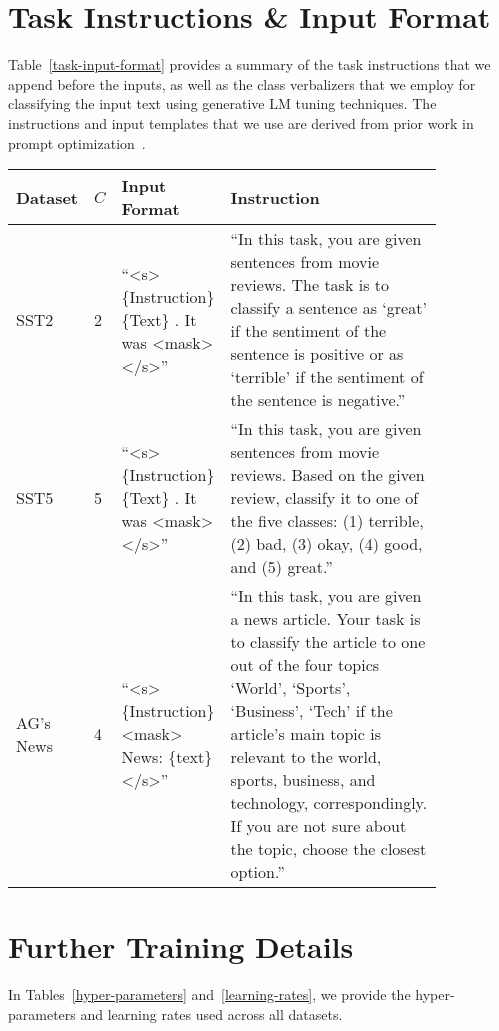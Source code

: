 \documentclass[11pt]{article}
\begin{document}



\appendix

\section{Task Instructions \& Input Format}
\label{task-instruct-input-format:appendix}
Table~\ref{task-input-format} provides a summary of the task instructions that we append before the inputs, as well as the class verbalizers that we employ for classifying the input text using generative LM tuning techniques. The instructions and input templates that we use are derived from prior work in prompt optimization~\cite{deng-etal-2022-rlprompt}.

\begin{table*}
\centering
\caption{Number of Classes $C$, the input format, and the instruction used per dataset. The label words are provided within the instructions.}
\begin{tabular}{ p{0.1\linewidth} | p{0.05\linewidth} | p{0.2\linewidth} | p{0.5\linewidth} }
\hline
Dataset & $C$ & Input Format & Instruction \\
\hline
SST2 & 2 & ``<s> \{Instruction\} \{Text\} . It was <mask> </s>'' & ``In this task, you are given sentences from movie reviews. The task is to classify a sentence as `great' if
the sentiment of the sentence is positive or as `terrible' if the sentiment of the sentence is negative.''\\
\hline
SST5 & 5 & ``<s> \{Instruction\} \{Text\} . It was <mask> </s>'' & ``In this task, you are given sentences from movie reviews. Based on the given review, classify it to one of
the five classes: (1) terrible, (2) bad, (3) okay, (4) good, and (5) great.''\\
\hline
AG’s News & 4 & ``<s> \{Instruction\} <mask> News: \{text\} </s>'' & ``In this task, you are given a news article. Your task is to classify the article to one out of the four topics
`World', `Sports', `Business', `Tech' if the article's main topic is relevant to the world, sports, business, and technology, correspondingly. If you are not sure about the topic, choose the closest option.''\\
\hline
\end{tabular}
\label{task-input-format}
\end{table*}

\section{Further Training Details}
\label{training-details-extra:appendix}
In Tables~\ref{hyper-parameters} and~\ref{learning-rates}, we provide the hyper-parameters and learning rates used across all datasets.
\end{document}
